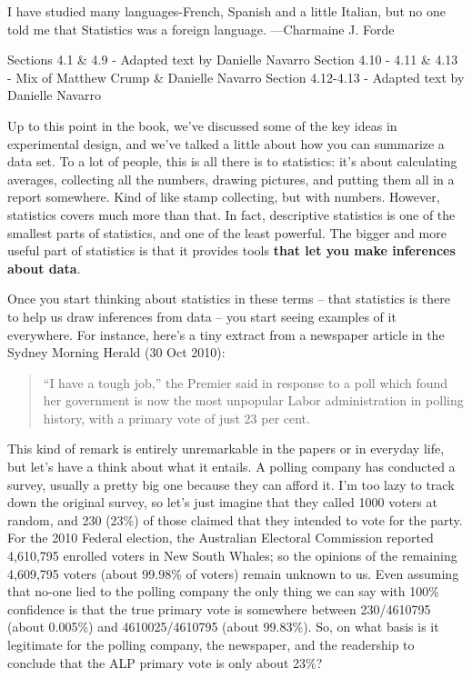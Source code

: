 \documentclass[
]{book}
\begin{document}
{
I have studied many languages-French, Spanish and a little Italian, but no one told me that Statistics was a foreign language.
---Charmaine J. Forde
}

\begin{marginnote}

Sections 4.1 \& 4.9 - Adapted text by Danielle Navarro
Section 4.10 - 4.11 \& 4.13 - Mix of Matthew Crump \& Danielle Navarro
Section 4.12-4.13 - Adapted text by Danielle Navarro

\end{marginnote}

Up to this point in the book, we've discussed some of the key ideas in experimental design, and we've talked a little about how you can summarize a data set. To a lot of people, this is all there is to statistics: it's about calculating averages, collecting all the numbers, drawing pictures, and putting them all in a report somewhere. Kind of like stamp collecting, but with numbers. However, statistics covers much more than that. In fact, descriptive statistics is one of the smallest parts of statistics, and one of the least powerful. The bigger and more useful part of statistics is that it provides tools \textbf{that let you make inferences about data}.

Once you start thinking about statistics in these terms -- that statistics is there to help us draw inferences from data -- you start seeing examples of it everywhere. For instance, here's a tiny extract from a newspaper article in the Sydney Morning Herald (30 Oct 2010):

\begin{quote}
``I have a tough job,'' the Premier said in response to a poll which found her government is now the most unpopular Labor administration in polling history, with a primary vote of just 23 per cent.
\end{quote}

This kind of remark is entirely unremarkable in the papers or in everyday life, but let's have a think about what it entails. A polling company has conducted a survey, usually a pretty big one because they can afford it. I'm too lazy to track down the original survey, so let's just imagine that they called 1000 voters at random, and 230 (23\%) of those claimed that they intended to vote for the party. For the 2010 Federal election, the Australian Electoral Commission reported 4,610,795 enrolled voters in New South Whales; so the opinions of the remaining 4,609,795 voters (about 99.98\% of voters) remain unknown to us. Even assuming that no-one lied to the polling company the only thing we can say with 100\% confidence is that the true primary vote is somewhere between 230/4610795 (about 0.005\%) and 4610025/4610795 (about 99.83\%). So, on what basis is it legitimate for the polling company, the newspaper, and the readership to conclude that the ALP primary vote is only about 23\%?
\end{document}
